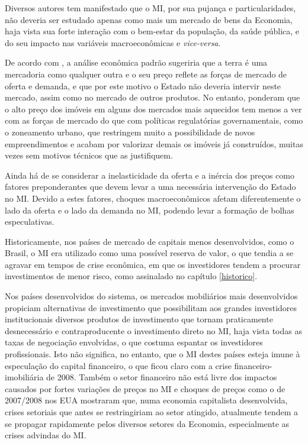 \documentclass[
	12pt,				%
	oneside,			%
	a4paper,			%
	chapter=TITLE,		%
	section=TITLE,		%
	english,			%
	brazil				%
	]{abntex2}
\begin{document}
\begin{refsection}
Diversos autores tem manifestado que o \gls{MI}, por sua pujança e
particularidades, não deveria ser estudado apenas como mais um mercado de bens
da Economia, haja vista sua forte interação com o bem-estar da população, da
saúde pública, e do seu impacto nas variáveis macroeconômicas e \emph{vice-versa}.

De acordo com \textcite[p.~149-150]{Case2000}, a análise econômica padrão sugeriria que a
terra é uma mercadoria como qualquer outra e o seu preço reflete as forças de
mercado de oferta e demanda, e que por este motivo o Estado não deveria intervir
neste mercado, assim como no mercado de outros produtos. No entanto, \textcite{Case2000}
ponderam que o alto preço dos imóveis em alguns dos mercados mais aquecidos tem
menos a ver com as forças de mercado do que com políticas regulatórias
governamentais, como o zoneamento urbano, que restringem muito a possibilidade
de novos empreendimentos e acabam por valorizar demais os imóveis já
construídos, muitas vezes sem motivos técnicos que as justifiquem.

Ainda há de se considerar a inelasticidade da oferta e a inércia dos preços como
fatores preponderantes que devem levar a uma necessária intervenção do Estado no
\gls{MI}. Devido a estes fatores, choques macroeconômicos afetam diferentemente
o lado da oferta e o lado da demanda no \gls{MI}, podendo levar a formação de
bolhas especulativas.

Historicamente, nos países de mercado de capitais menos desenvolvidos, como o
Brasil, o \gls{MI} era utilizado como uma possível reserva de valor, o que tendia
a se agravar em tempos de crise econômica, em que os investidores tendem a
procurar investimentos de menor risco, como assinalado no capítulo \ref{historico}.

Nos países desenvolvidos do sistema, os mercados mobiliários mais desenvolvidos
propiciam alternativas de investimento que possibilitam aos grandes investidores
institucionais diversos produtos de investimento que tornam praticamente
desnecessário e contraproducente o investimento direto no \gls{MI}, haja vista
todas as taxas de negociação envolvidas, o que costuma espantar os investidores
profissionais. Isto não significa, no entanto, que o \gls{MI} destes países
esteja imune à especulação do capital financeiro, o que ficou claro com a crise
financeiro-imobiliária de 2008. Também o setor financeiro não está livre dos
impactos causados por fortes variações de preços no \gls{MI} e choques de preços
como o de 2007/2008 nos \gls{EUA} mostraram que, numa economia capitalista
desenvolvida, crises setoriais que antes se restringiriam ao setor atingido,
atualmente tendem a se propagar rapidamente pelos diversos setores da Economia,
especialmente as crises advindas do \gls{MI}.


\end{refsection}
\end{document}
